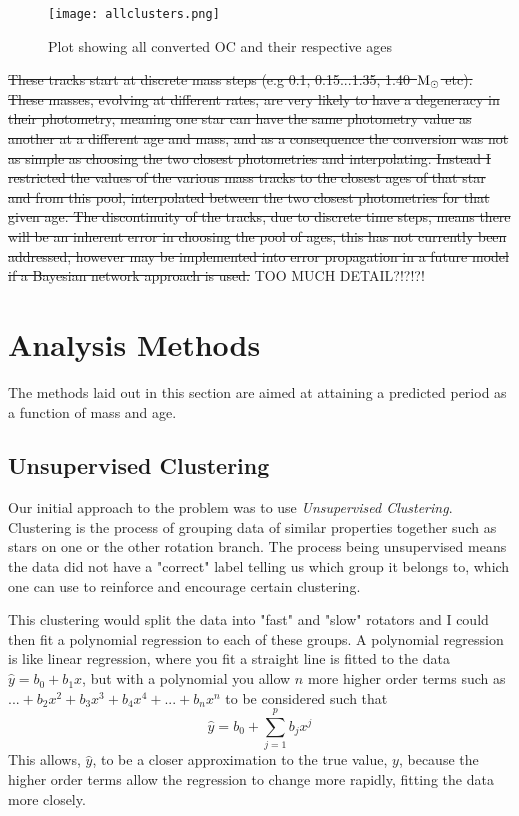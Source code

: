 \documentclass[fleqn,usenatbib]{mnras}
\begin{document}
\begin{figure}
	\centering
	\texttt{[image: allclusters.png]}
	\caption[]{Plot showing all converted OC and their respective ages}
	\label{fig:allclusters}
\end{figure}

\sout{These tracks start at discrete mass steps (e.g 0.1, 0.15...1.35, 1.40~$\textup{M}_\odot$ etc).
These masses, evolving at different rates, are very likely to have a degeneracy in their photometry, meaning one star can have the same photometry value as another at a different age and mass, and as a consequence the conversion was not as simple as choosing the two closest photometries and interpolating.
Instead I restricted the values of the various mass tracks to the closest ages of that star and from this pool, interpolated between the two closest photometries for that given age.
The discontinuity of the tracks, due to discrete time steps, means there will be an inherent error in choosing the pool of ages, this has not currently been addressed, however may be implemented into error propagation in a future model if a Bayesian network approach is used.} TOO MUCH DETAIL?!?!?!

\section{Analysis Methods}
The methods laid out in this section are aimed at attaining a predicted period as a function of mass and age.
\subsection{Unsupervised Clustering}
Our initial approach to the problem was to use \textit{Unsupervised Clustering}.
Clustering is the process of grouping data of similar properties together such as stars on one or the other rotation branch.
The process being unsupervised means the data did not have a "correct" label telling us which group it belongs to, which one can use to reinforce and encourage certain clustering.

This clustering would split the data into "fast" and "slow" rotators and I could then fit a polynomial regression to each of these groups.
A polynomial regression is like linear regression, where you fit a straight line is fitted to the data $\hat{y} = b_0 + b_1x$, but with a polynomial you allow $n$ more higher order terms such as $...+ b_2x^2 + b_3x^3+b_4x^4+...+b_nx^n $ to be considered such that
\begin{equation}
	\label{eq:poly}
	\hat{y} = b_0 + \sum_{j = 1}^p b_jx^j
\end{equation}
This allows, $\hat{y}$, to be a closer approximation to the true value, $y$, because the higher order terms allow the regression to change more rapidly, fitting the data more closely.
\end{document}
